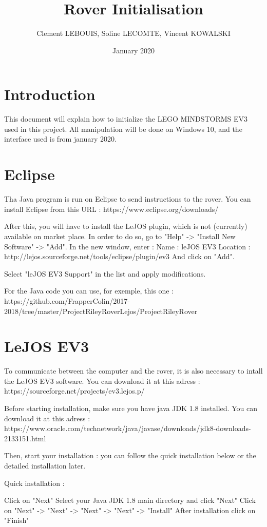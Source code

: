 \documentclass{article}
\title{Rover Initialisation}
\author{Clement LEBOUIS, Soline LECOMTE, Vincent KOWALSKI}
\date{January 2020}
\begin{document}
\maketitle

\section{Introduction}
This document will explain how to initialize the LEGO MINDSTORMS EV3 used in this project.
All manipulation will be done on Windows 10, and the interface used is from january 2020.

\section{Eclipse}

Tha Java program is run on Eclipse to send instructions to the rover. You can install Eclipse from this URL :
https://www.eclipse.org/downloads/

After this, you will have to install the LeJOS plugin, which is not (currently) available on market place.
In order to do so, go to "Help" -> "Install New Software" -> "Add".
In the new window, enter :
Name : leJOS EV3
Location :  http://lejos.sourceforge.net/tools/eclipse/plugin/ev3
And click on "Add".

Select "leJOS EV3 Support" in the list and apply modifications.

For the Java code you can use, for exemple, this one :
https://github.com/FrapperColin/2017-2018/tree/master/ProjectRileyRoverLejos/ProjectRileyRover

\section{LeJOS EV3}

To communicate between the computer and the rover, it is also necessary to intall the LeJOS EV3 software.
You can download it at this adress :
https://sourceforge.net/projects/ev3.lejos.p/

Before starting installation, make sure you have java JDK 1.8 installed.
You can download it at this adress :
https://www.oracle.com/technetwork/java/javase/downloads/jdk8-downloads-2133151.html

Then, start your installation : you can follow the quick installation below or the detailed installation later.

Quick installation :

Click on "Next"
Select your Java JDK 1.8 main directory and click "Next"
Click on "Next" -> "Next" -> "Next" -> "Next" -> "Install"
After installation click on "Finish"
\end{document}
